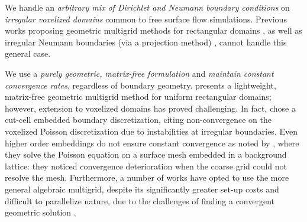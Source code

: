 


We handle an \emph{arbitrary mix of Dirichlet and Neumann boundary conditions} on \emph{irregular voxelized domains} common to free surface flow simulations. Previous works proposing geometric multigrid methods for rectangular domains \cite{TO94,AF96,BWR05,BWK06,KH08}, as well as irregular Neumann boundaries (via a projection method) \cite{MCPN08}, cannot handle this general case.  

We use a \emph{purely geometric, matrix-free formulation} and \emph{maintain constant convergence rates}, regardless of boundary geometry.  \cite{BWR05} presents a lightweight, matrix-free geometric multigrid method for uniform rectangular domains; however, extension to voxelized domains has proved challenging.  In fact, \cite{HMB05} chose a cut-cell embedded boundary discretization, citing non-convergence on the voxelized Poisson discretization due to instabilities at irregular boundaries.  Even higher order embeddings do not ensure constant convergence as noted by \cite{CLB09}, where they solve the Poisson equation on a surface mesh embedded in a background lattice: they noticed convergence deterioration when the coarse grid could not resolve the mesh.  Furthermore, a number of works have opted to use the more general algebraic multigrid, despite its significantly greater set-up costs and difficult to parallelize nature\cite{trottenberg:2001:multigrid}, due to the challenges of finding a convergent geometric solution \cite{CNF07, CGR04, PM04}.

